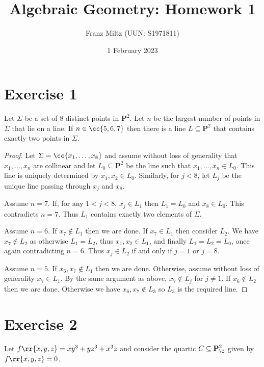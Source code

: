 \documentclass{article}
\begin{document}
\title{Algebraic Geometry: Homework 1}
\author{Franz Miltz (UUN: S1971811)}
\date{1 February 2023}
\maketitle

\section*{Exercise 1}

\begin{claim*}
  Let $\Sigma$ be a set of 8 distinct points in $\mathbf P^2$. Let $n$ be the largest number
  of points in $\Sigma$ that lie on a line. If $n\in\cc{5,6,7}$ then there is a line
  $L\subseteq\mathbf P^2$ that contains exactly two points in $\Sigma$.
  \begin{proof}
    Let $\Sigma=\cc{x_1,\ldots,x_8}$ and assume without loss of generality that
    $x_1,\ldots,x_n$ are collinear and let $L_0\subseteq\mathbf P^2$ be the line such
    that $x_1,\ldots,x_n\in L_0$. This line is uniquely determined by $x_1,x_2\in L_0$.
    Similarly, for $j<8$, let $L_j$ be the unique line passing through $x_j$ and $x_8$.

    Assume $n=7$. If, for any $1<j<8$, $x_j\in L_1$ then $L_1=L_0$ and $x_8\in L_0$.
    This contradicts $n=7$. Thus $L_1$ contains exactly two elements of $\Sigma$.

    Assume $n=6$. If $x_7\not\in L_1$ then we are done. If $x_7\in L_1$ then consider
    $L_2$. We have $x_7\not\in L_2$ as otherwise $L_1=L_2$, thus $x_1,x_2\in L_1$, and finally
    $L_1=L_2=L_0$, once again contradicting $n=6$. Thus $x_j\in L_2$ if and only if
    $j=1$ or $j=8$.

    Assume $n=5$. If $x_6,x_7\not\in L_1$ then we are done. Otherwise, assume without loss
    of generality $x_7\in L_1$. By the same argument as above, $x_7\not\in L_j$ for $j\neq 1$.
    If $x_6\not\in L_2$ then we are done. Otherwise we have $x_6,x_7\not\in L_3$
    so $L_3$ is the required line.
  \end{proof}
\end{claim*}

\section*{Exercise 2}

Let $f\rr{x,y,z}=xy^3+yz^3+x^3z$ and consider the quartic
$C\subseteq\mathbf P^2_{\C}$ given by $f\rr{x,y,z}=0$.
\end{document}
